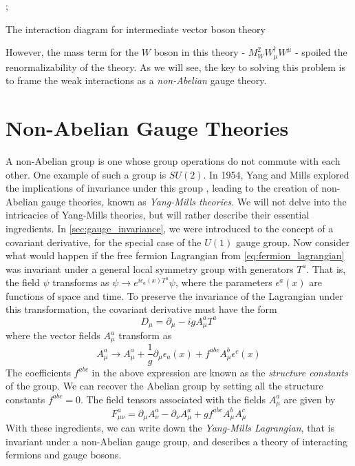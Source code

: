 \begin{marginfigure}
;
\caption{The interaction diagram for intermediate vector boson theory}
\end{marginfigure}
However, the mass term for the $W$ boson in this theory - $M_W^2W_\mu^\dagger W^\mu$ - spoiled the renormalizability of the theory. As we will see, the key to solving this problem is to frame the weak interactions as a \emph{non-Abelian} gauge theory. 

\section{Non-Abelian Gauge Theories}\label{sec:non_abelian}
A non-Abelian group is one whose group operations do not commute with each other. One example of such a group is $SU(2)$. In 1954, Yang and Mills explored the implications of invariance under this group \citep{Yang1954}, leading to the creation of non-Abelian gauge theories, known as \emph{Yang-Mills theories}. 
We will not delve into the intricacies of Yang-Mills theories, but will rather describe their essential ingredients. In \autoref{sec:gauge_invariance}, we were introduced to the concept of a covariant derivative, for the special case of the $U(1)$ gauge group. Now consider what would happen if the free fermion Lagrangian from \eqref{eq:fermion_lagrangian} was invariant under a general local symmetry group with generators $T^a$. That is, the field $\psi$ transforms as $\psi\rightarrow e^{i\epsilon_a(x) T^a}\psi$, where the parameters $\epsilon^a(x)$ are functions of space and time. To preserve the invariance of the Lagrangian under this transformation, the covariant derivative must have the form 
$$D_\mu = \partial_\mu - igA_\mu^aT^a$$
where the vector fields $A_\mu^a$ transform as 
$$A_\mu^a\rightarrow A_\mu^a + \frac{1}{g}\partial_\mu\epsilon_a(x) + f^{abc}A_\mu^b\epsilon^c(x)$$ 
The coefficients $f^{abc}$ in the above expression are known as the \emph{structure constants} of the group. We can recover the Abelian group by setting all the structure constants $f^{abc} = 0$. The field tensors associated with the fields $A_\mu^a$ are given by
$$F_{\mu\nu}^a = \partial_\mu A_\nu^a - \partial_\nu A_\mu^a + gf^{abc}A_\mu^b A_\mu^c$$
With these ingredients, we can write down the \emph{Yang-Mills Lagrangian}, that is invariant under a non-Abelian gauge group, and describes a theory of interacting fermions and gauge bosons.
